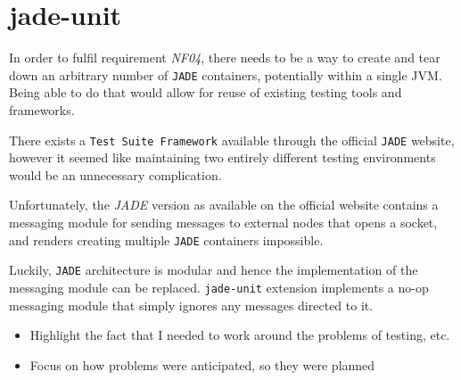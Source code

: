\section{jade-unit}
In order to fulfil requirement \textit{NF04}, there needs to be a way to create and tear down an arbitrary number of \texttt{JADE} containers, potentially within a single JVM. Being able to do that would allow for reuse of existing testing tools and frameworks. 

There exists a \texttt{Test Suite Framework} available through the official \texttt{JADE} website, however it seemed like maintaining two entirely different testing environments would be an unnecessary complication.

Unfortunately, the \textit{JADE} version as available on the official website contains a messaging module for sending messages to external nodes that opens a socket, and renders creating multiple \texttt{JADE} containers impossible.

Luckily, \texttt{JADE} architecture is modular and hence the implementation of the messaging module can be replaced. \texttt{jade-unit} extension implements a no-op messaging module that simply ignores any messages directed to it.

\begin{itemize}
\item Highlight the fact that I needed to work around the problems of testing, etc.
\item Focus on how problems were anticipated, so they were planned
\end{itemize}